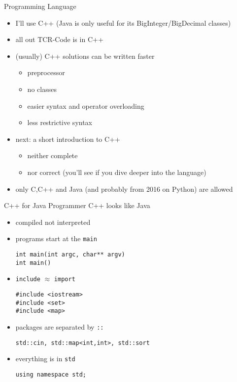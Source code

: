 \documentclass[12pt,t]{beamer}
\newcommand{\bi}{\begin{itemize}}
\newcommand{\ei}{\end{itemize}}
\begin{document}
\begin{frame}{Programming Language}
    \vspace{10pt}
    \bi
        \item I'll use C++ (Java is only useful for its BigInteger/BigDecimal classes)
        \item all out TCR-Code is in C++
        \item (usually) C++ solutions can be written faster
        \bi
	  \item preprocessor
	  \item no classes
	  \item easier syntax and operator overloading
	  \item less restrictive syntax
        \ei
        \item next: a short introduction to C++
        \bi
	  \item neither complete
	  \item nor correct (you'll see if you dive deeper into the language)
        \ei
        \item only C,C++ and Java (and probably from 2016 on Python) are allowed
    \ei
\end{frame}


\begin{frame}[fragile]{C++ for Java Programmer}
    C++ looks like Java
    \pause
    \vspace{10pt}
    \bi
      \item compiled not interpreted
      \item programs start at the \texttt{main}
	  \begin{verbatim}
int main(int argc, char** argv)
int main()
	  \end{verbatim}
      \item \texttt{include} $\approx$ \texttt{import}
	  \begin{verbatim}
#include <iostream>
#include <set>
#include <map>
        \end{verbatim}
        \item packages are separated by \texttt{::}
        \begin{verbatim}
std::cin, std::map<int,int>, std::sort
        \end{verbatim}
        \item everything is in \texttt{std}
        \begin{verbatim}
using namespace std;
        \end{verbatim}
    \ei
\end{frame}
\end{document}
